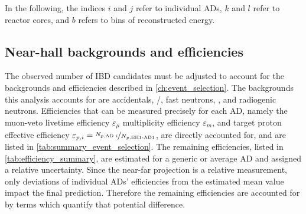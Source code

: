 In the following, the indices $i$ and $j$ refer to individual ADs,
$k$ and $l$ refer to reactor cores,
and $b$ refers to bins of reconstructed energy.

\subsection{Near-hall backgrounds and efficiencies}
\label{subsec:near_bg_eff}

The observed number of IBD candidates must be adjusted
to account for the backgrounds and efficiencies described in \cref{ch:event_selection}.
The backgrounds this analysis accounts for are
accidentals, \li{}/\he{}, fast neutrons, \amc{}, and radiogenic neutrons.
Efficiencies that can be measured precisely for each AD,
namely
the muon-veto livetime efficiency $\varepsilon_\mu$
multiplicity efficiency $\varepsilon_m$,
and target proton effective efficiency
$\varepsilon_{p,i}=\nicefrac{N_{p,\text{AD }i}}{N_{p,\text{EH1-AD1}}}$,
are directly accounted for,
and are listed in \cref{tab:summary_event_selection}.
The remaining efficiencies, listed in \cref{tab:efficiency_summary},
are estimated for a generic or average AD and assigned a relative uncertainty.
Since the near-far projection is a relative measurement,
only deviations of individual ADs' efficiencies from the estimated mean value
impact the final prediction.
Therefore the remaining efficiencies are accounted for
by terms which quantify that potential difference.

